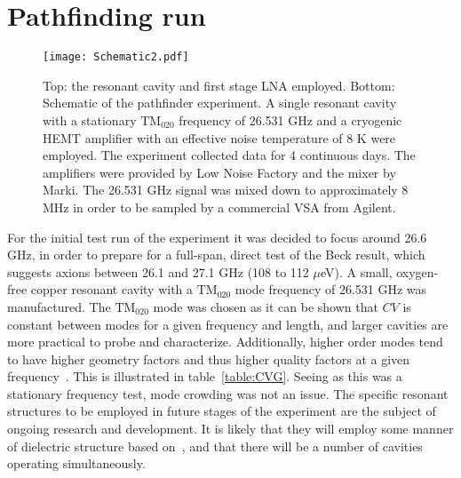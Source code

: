\documentclass[preprint]{elsarticle}
\begin{document}
\section{Pathfinding run}
\begin{figure}[t!]
	\centering
	\texttt{[image: Schematic2.pdf]}
	\caption{Top: the resonant cavity and first stage LNA employed. Bottom: Schematic of the pathfinder experiment. A single resonant cavity with a stationary $\text{TM}_{020}$ frequency of 26.531 GHz and a cryogenic HEMT amplifier with an effective noise temperature of 8 K were employed. The experiment collected data for 4 continuous days. The amplifiers were provided by Low Noise Factory and the mixer by Marki. The 26.531 GHz signal was mixed down to approximately 8 MHz in order to be sampled by a commercial VSA from Agilent.}
	\label{fig:pathfinderschematic}
\end{figure}
For the initial test run of the experiment it was decided to focus around 26.6 GHz, in order to prepare for a full-span, direct test of the Beck result, which suggests axions between 26.1 and 27.1 GHz (108 to 112 $\mu$eV). A small, oxygen-free copper resonant cavity with a $\text{TM}_{020}$ mode frequency of 26.531 GHz was manufactured. The $\text{TM}_{020}$ mode was chosen as it can be shown that $CV$ is constant between modes for a given frequency and length, and larger cavities are more practical to probe and characterize. Additionally, higher order modes tend to have higher geometry factors and thus higher quality factors at a given frequency~\cite{ORGANPatras2016}. This is illustrated in table~\ref{table:CVG}. Seeing as this was a stationary frequency test, mode crowding was not an issue. The specific resonant structures to be employed in future stages of the experiment are the subject of ongoing research and development. It is likely that they will employ some manner of dielectric structure based on~\cite{DielectricSupermode}, and that there will be a number of cavities operating simultaneously.
\end{document}
